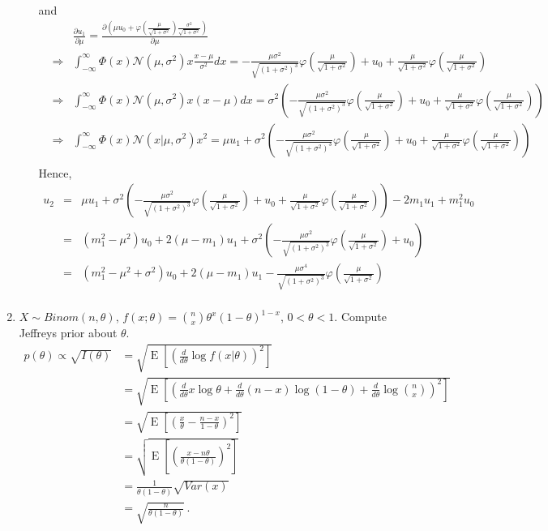 \documentclass[10pt,a4paper]{article}
\def\MN{{\mathcal N}}
\begin{document}
\begin{enumerate}
\begin{enumerate}
\begin{eqnarray*}
\end{eqnarray*}
and 
\begin{eqnarray*}
&& \frac{\partial u_1}{\partial \mu} = \frac{\partial(\mu u_0+ \varphi(\frac{\mu}{\sqrt{1+\sigma^2}})\frac{\sigma^2}{\sqrt{1+\sigma^2}})}{\partial \mu} \\
&\Longrightarrow &\int_{-\infty}^{\infty}\Phi(x)\MN(\mu,\sigma^2)x\frac{x-\mu}{\sigma^2}dx = -\frac{\mu\sigma^2}{\sqrt{(1+\sigma^2)^{3}}}\varphi(\frac{\mu}{\sqrt{1+\sigma^2}})+u_0+\frac{\mu}{\sqrt{1+\sigma^2}}\varphi(\frac{\mu}{\sqrt{1+\sigma^2}}) \\
&\Longrightarrow &\int_{-\infty}^{\infty}\Phi(x)\MN(\mu,\sigma^2)x(x-\mu)dx = \sigma^2\left(-\frac{\mu\sigma^2}{\sqrt{(1+\sigma^2)^{3}}}\varphi(\frac{\mu}{\sqrt{1+\sigma^2}})+u_0+\frac{\mu}{\sqrt{1+\sigma^2}}\varphi(\frac{\mu}{\sqrt{1+\sigma^2}})\right) \\
&\Longrightarrow &\int_{-\infty}^{\infty} \Phi(x) \MN(x|\mu, \sigma^2)x^2 = \mu u_1+ \sigma^2\left(-\frac{\mu\sigma^2}{\sqrt{(1+\sigma^2)^{3}}}\varphi(\frac{\mu}{\sqrt{1+\sigma^2}})+u_0+\frac{\mu}{\sqrt{1+\sigma^2}}\varphi(\frac{\mu}{\sqrt{1+\sigma^2}})\right) \\
\end{eqnarray*}
Hence,
\begin{eqnarray*}
u_2 &=& \mu u_1+ \sigma^2\left(-\frac{\mu\sigma^2}{\sqrt{(1+\sigma^2)^{3}}}\varphi(\frac{\mu}{\sqrt{1+\sigma^2}})+u_0+\frac{\mu}{\sqrt{1+\sigma^2}}\varphi(\frac{\mu}{\sqrt{1+\sigma^2}})\right)-2m_1u_1+m_1^2u_0 \\
&=& (m_1^2-\mu^2)u_0 +2(\mu-m_1)u_1+\sigma^2\left(-\frac{\mu\sigma^2}{\sqrt{(1+\sigma^2)^{3}}}\varphi(\frac{\mu}{\sqrt{1+\sigma^2}})+u_0\right) \\
&=& (m_1^2-\mu^2+\sigma^2)u_0 +2(\mu-m_1)u_1-\frac{\mu\sigma^4}{\sqrt{(1+\sigma^2)^{3}}}\varphi(\frac{\mu}{\sqrt{1+\sigma^2}}) \\
\end{eqnarray*}
\end{enumerate}

\item $X\sim Binom(n,\theta)$, $f(x; \theta) = {n\choose x}\theta^x(1-\theta)^{1-x}$, $0 < \theta < 1$. Compute Jeffreys prior about $\theta$. 
\begin{align*}p(\theta)  \propto \sqrt{I(\theta)} &= \sqrt{\operatorname{E}\!\left[ \left( \frac{d}{d\theta} \log f(x|\theta) \right)^2\right]} \\
&= \sqrt{\operatorname{E}\!\left[ \left( \frac{d}{d\theta} x\log\theta +\frac{d}{d\theta}(n-x)\log(1-\theta)+\frac{d}{d\theta}\log{n \choose x} \right)^2\right]} \\
&= \sqrt{\operatorname{E}\!\left[ \left( \frac{x}{\theta} - \frac{n-x}{1-\theta}\right)^2 \right]} \\ 
& = \sqrt{\operatorname{E}\!\left[ \left(\frac{x-n\theta}{\theta(1-\theta)} \right)^2 \right]} \\
&= \frac{1}{\theta(1-\theta)}\sqrt{Var(x)} \\
&= \sqrt{\frac{n}{\theta(1-\theta)}}\,.
\end{align*} 



\end{enumerate}
\end{document}
